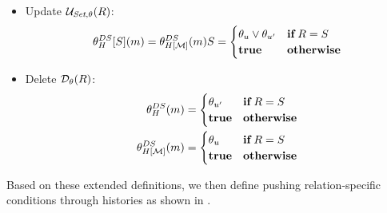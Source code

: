 \begin{itemize}
\item Update $\mathcal{U}_{\textit{Set},\theta}(R)$:
  \begin{align*}
    \theta_{H}^{DS}[S](m) = \theta_{H[\mathcal{M}]}^{DS}(m){S} =
    \begin{cases}
      \theta_{u} \vee \theta_{u'} &\mathbf{if}\, R = S\\
      \mathbf{true} & \mathbf{otherwise}\\
    \end{cases}
  \end{align*}
\item Delete $\mathcal{D}_{\theta}(R)$:
  \begin{align*}
    \theta_{H}^{DS}(m) &=
                      \begin{cases}
                        \theta_{u'} &\mathbf{if}\, R = S\\
                        \mathbf{true} & \mathbf{otherwise}\\
                      \end{cases}\\
    \theta_{H[\mathcal{M}]}^{DS}(m) &=
                      \begin{cases}
                        \theta_{u} &\mathbf{if}\, R = S\\
                        \mathbf{true} & \mathbf{otherwise}\\
                      \end{cases}
  \end{align*}
\end{itemize}

Based on these extended definitions, we then define pushing relation-specific conditions through histories as shown in .

